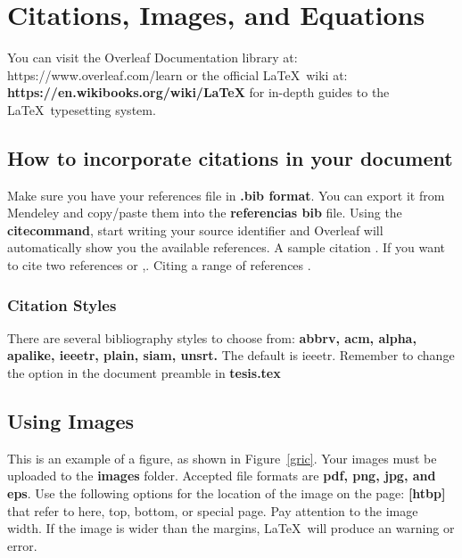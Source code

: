 
\chapter{Citations, Images, and Equations}  

\noindent You can visit the Overleaf Documentation library at: https://www.overleaf.com/learn or the official \LaTeX\ wiki at: \textbf{https://en.wikibooks.org/wiki/LaTeX} for in-depth guides to the \LaTeX\ typesetting system.

\section{How to incorporate citations in your document}


\noindent Make sure you have your references file in \textbf{.bib format}. You can export it from Mendeley and copy/paste them into the \textbf{referencias bib} file. Using the \textbf{citecommand}, start writing your source identifier and Overleaf will automatically show you the available references. A sample citation \cite{dirac}. If you want to cite two references \cite{einstein,knuth-fa} or \cite{einstein},\cite{knuth-fa}. Citing a range of references \cite{einstein,knuth-fa,radiation2}.


\subsection{Citation Styles}
\noindent There are several bibliography styles to choose from: \textbf{abbrv, acm, alpha, apalike, ieeetr, plain, siam, unsrt.} The default is ieeetr. Remember to change the option in the document preamble in \textbf{tesis.tex} %


\section{Using Images}





\noindent This is an example of a figure, as shown in Figure~\ref{gric}. Your images must be uploaded to the \textbf{images} folder. Accepted file formats are \textbf{pdf, png, jpg, and eps}. Use the following options for the location of the image on the page: \textbf{[htbp]} that refer to here, top, bottom, or special page. Pay attention to the image width. If the image is wider than the margins, \LaTeX\ will produce an warning or error.

